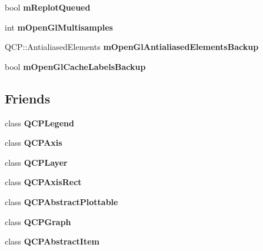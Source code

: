 \begin{DoxyCompactItemize}
\item 
\mbox{\label{class_q_custom_plot_acedeef316dfcde835b8ea0112cec2a77}} 
bool {\bfseries m\+Replot\+Queued}
\item 
\mbox{\label{class_q_custom_plot_aacafac2b2280b6a868a4b734273a394c}} 
int {\bfseries m\+Open\+Gl\+Multisamples}
\item 
\mbox{\label{class_q_custom_plot_adbf005715d5f8550511819a4baf841fb}} 
Q\+C\+P\+::\+Antialiased\+Elements {\bfseries m\+Open\+Gl\+Antialiased\+Elements\+Backup}
\item 
\mbox{\label{class_q_custom_plot_ab1692469dde841080fa33719533bf2b7}} 
bool {\bfseries m\+Open\+Gl\+Cache\+Labels\+Backup}
\end{DoxyCompactItemize}
\subsection*{Friends}
\begin{DoxyCompactItemize}
\item 
\mbox{\label{class_q_custom_plot_a8429035e7adfbd7f05805a6530ad5e3b}} 
class {\bfseries Q\+C\+P\+Legend}
\item 
\mbox{\label{class_q_custom_plot_af123edeca169ec7a31958a1d714e1a8a}} 
class {\bfseries Q\+C\+P\+Axis}
\item 
\mbox{\label{class_q_custom_plot_a5dbf96bf7664c1b6fce49063eeea6eef}} 
class {\bfseries Q\+C\+P\+Layer}
\item 
\mbox{\label{class_q_custom_plot_acbf20ecb140f66c5fd1bc64ae0762990}} 
class {\bfseries Q\+C\+P\+Axis\+Rect}
\item 
\mbox{\label{class_q_custom_plot_a53cf0e76aca814550c796fed79e345d6}} 
class {\bfseries Q\+C\+P\+Abstract\+Plottable}
\item 
\mbox{\label{class_q_custom_plot_ad0c52e327d94c699d415fd61f930700a}} 
class {\bfseries Q\+C\+P\+Graph}
\item 
\mbox{\label{class_q_custom_plot_a93e962f2e677e31ecc575bb884e46adf}} 
class {\bfseries Q\+C\+P\+Abstract\+Item}
\end{DoxyCompactItemize}


